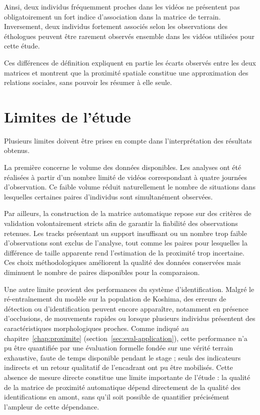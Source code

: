 \documentclass[11pt,a4paper]{report}
\begin{document}
Ainsi, deux individus fréquemment proches dans les vidéos ne présentent
pas obligatoirement un fort indice d'association dans la matrice de
terrain. Inversement, deux individus fortement associés selon les
observations des éthologues peuvent être rarement observés ensemble dans
les vidéos utilisées pour cette étude.

Ces différences de définition expliquent en partie les écarts observés
entre les deux matrices et montrent que la proximité spatiale constitue
une approximation des relations sociales, sans pouvoir les résumer à
elle seule.

\section{Limites de l'étude}

Plusieurs limites doivent être prises en compte dans l'interprétation des
résultats obtenus.

La première concerne le volume des données disponibles. Les analyses ont
été réalisées à partir d'un nombre limité de vidéos correspondant à
quatre journées d'observation. Ce faible volume réduit naturellement le
nombre de situations dans lesquelles certaines paires d'individus sont
simultanément observées.

Par ailleurs, la construction de la matrice automatique repose sur des
critères de validation volontairement stricts afin de garantir la
fiabilité des observations retenues. Les tracks présentant un support
insuffisant ou un nombre trop faible d'observations sont exclus de
l'analyse, tout comme les paires pour lesquelles la différence de taille
apparente rend l'estimation de la proximité trop incertaine. Ces choix
méthodologiques améliorent la qualité des données conservées mais
diminuent le nombre de paires disponibles pour la comparaison.

Une autre limite provient des performances du système d'identification.
Malgré le ré-entraînement du modèle sur la population de Koshima, des
erreurs de détection ou d'identification peuvent encore apparaître,
notamment en présence d'occlusions, de mouvements rapides ou lorsque
plusieurs individus présentent des caractéristiques morphologiques
proches. Comme indiqué au chapitre~\ref{chap:proximite}
(section~\ref{sec:eval-application}), cette performance n'a pu être
quantifiée par une évaluation formelle fondée sur une vérité terrain
exhaustive, faute de temps disponible pendant le stage ; seuls des
indicateurs indirects et un retour qualitatif de l'encadrant ont pu être
mobilisés. Cette absence de mesure directe constitue une limite
importante de l'étude : la qualité de la matrice de proximité automatique
dépend directement de la qualité des identifications en amont, sans qu'il
soit possible de quantifier précisément l'ampleur de cette dépendance.
\end{document}
